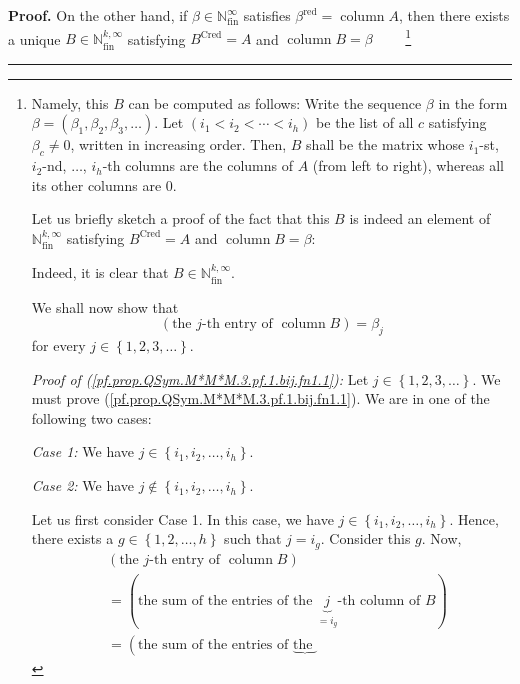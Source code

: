 \documentclass[numbers=enddot,12pt,final,onecolumn,notitlepage,abstracton]{scrartcl}%
\theoremstyle{definition}
\newenvironment{proof}[1][Proof]{\noindent\textbf{#1.} }{\ \rule{0.5em}{0.5em}}
\begin{document}
\begin{proof}
On the other hand, if $\beta\in\mathbb{N}_{\operatorname*{fin}}^{\infty}$
satisfies $\beta^{\operatorname*{red}}=\operatorname*{column}A$, then there
exists a unique $B\in\mathbb{N}_{\operatorname*{fin}}^{k,\infty}$ satisfying
$B^{\operatorname*{Cred}}=A$ and $\operatorname*{column}B=\beta$%
\ \ \ \ \footnote{Namely, this $B$ can be computed as follows: Write the
sequence $\beta$ in the form $\beta=\left(  \beta_{1},\beta_{2},\beta
_{3},\ldots\right)  $. Let $\left(  i_{1}<i_{2}<\cdots<i_{h}\right)  $ be the
list of all $c$ satisfying $\beta_{c}\neq0$, written in increasing order.
Then, $B$ shall be the matrix whose $i_{1}$-st, $i_{2}$-nd, $\ldots$, $i_{h}%
$-th columns are the columns of $A$ (from left to right), whereas all its
other columns are $0$.
\par
Let us briefly sketch a proof of the fact that this $B$ is indeed an element
of $\mathbb{N}_{\operatorname*{fin}}^{k,\infty}$ satisfying
$B^{\operatorname*{Cred}}=A$ and $\operatorname*{column}B=\beta$:
\par
Indeed, it is clear that $B\in\mathbb{N}_{\operatorname*{fin}}^{k,\infty}$.
\par
We shall now show that%
\begin{equation}
\left(  \text{the }j\text{-th entry of }\operatorname*{column}B\right)
=\beta_{j} \label{pf.prop.QSym.M*M*M.3.pf.1.bij.fn1.1}%
\end{equation}
for every $j\in\left\{  1,2,3,\ldots\right\}  $.
\par
\textit{Proof of (\ref{pf.prop.QSym.M*M*M.3.pf.1.bij.fn1.1}):} Let
$j\in\left\{  1,2,3,\ldots\right\}  $. We must prove
(\ref{pf.prop.QSym.M*M*M.3.pf.1.bij.fn1.1}). We are in one of the following
two cases:
\par
\textit{Case 1:} We have $j\in\left\{  i_{1},i_{2},\ldots,i_{h}\right\}  $.
\par
\textit{Case 2:} We have $j\notin\left\{  i_{1},i_{2},\ldots,i_{h}\right\}  $.
\par
Let us first consider Case 1. In this case, we have $j\in\left\{  i_{1}%
,i_{2},\ldots,i_{h}\right\}  $. Hence, there exists a $g\in\left\{
1,2,\ldots,h\right\}  $ such that $j=i_{g}$. Consider this $g$. Now,
\begin{align*}
&  \left(  \text{the }j\text{-th entry of }\operatorname*{column}B\right) \\
&  =\left(  \text{the sum of the entries of the }\underbrace{j}_{=i_{g}%
}\text{-th column of }B\right) \\
&  =\left(  \text{the sum of the entries of }\underbrace{\text{the }%
}
\end{align*}}
\end{proof}
\end{document}
